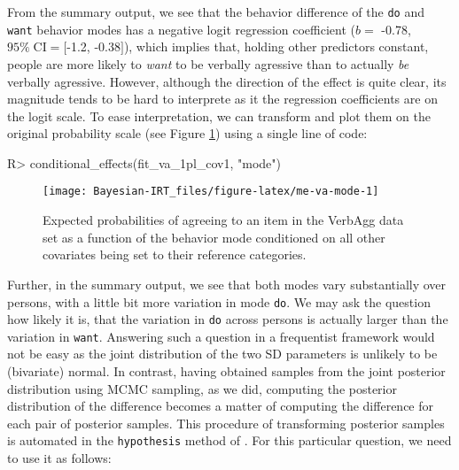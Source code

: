 \documentclass[
]{jss}
\begin{document}
From the summary output, we see that the behavior difference of the
\texttt{do} and \texttt{want} behavior modes has a negative logit
regression coefficient (\(b =\) -0.78, \(95\% \; \text{CI} = [\)-1.2,
-0.38\(]\)), which implies that, holding other predictors constant,
people are more likely to \emph{want} to be verbally agressive than to
actually \emph{be} verbally agressive. However, although the direction
of the effect is quite clear, its magnitude tends to be hard to
interprete as it the regression coefficients are on the logit scale. To
ease interpretation, we can transform and plot them on the original
probability scale (see Figure \ref{fig:me-va-mode}) using a single line
of code:

\begin{CodeChunk}

\begin{CodeInput}
R> conditional_effects(fit_va_1pl_cov1, "mode")
\end{CodeInput}
\begin{figure}

{\centering \texttt{[image: Bayesian-IRT\_files/figure-latex/me-va-mode-1]} 

}

\caption[Expected probabilities of agreeing to an item in the VerbAgg data set as a function of the behavior mode conditioned on all other covariates being set to their reference categories]{Expected probabilities of agreeing to an item in the VerbAgg data set as a function of the behavior mode conditioned on all other covariates being set to their reference categories.}\label{fig:me-va-mode}
\end{figure}
\end{CodeChunk}

Further, in the summary output, we see that both modes vary
substantially over persons, with a little bit more variation in mode
\texttt{do}. We may ask the question how likely it is, that the
variation in \texttt{do} across persons is actually larger than the
variation in \texttt{want}. Answering such a question in a frequentist
framework would not be easy as the joint distribution of the two SD
parameters is unlikely to be (bivariate) normal. In contrast, having
obtained samples from the joint posterior distribution using MCMC
sampling, as we did, computing the posterior distribution of the
difference becomes a matter of computing the difference for each pair of
posterior samples. This procedure of transforming posterior samples is
automated in the \texttt{hypothesis} method of . For this
particular question, we need to use it as follows:
\end{document}
